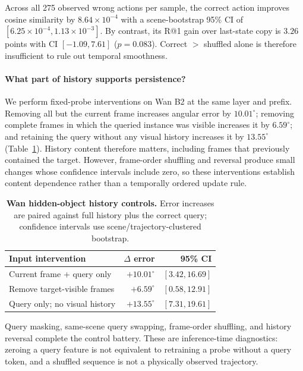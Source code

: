 Across all 275 observed wrong actions per sample, the correct action improves
cosine similarity by $8.64\!\times\!10^{-4}$ with a scene-bootstrap 95\% CI of
$[6.25\!\times\!10^{-4},1.13\!\times\!10^{-3}]$.  By contrast, its R@1 gain
over last-state copy is $3.26$ points with CI $[-1.09,7.61]$ ($p=0.083$).
Correct $>$ shuffled alone is therefore insufficient to rule out temporal
smoothness.

\paragraph{What part of history supports persistence?}
We perform fixed-probe interventions on Wan B2 at the same layer and prefix.
Removing all but the current frame increases angular error by
$10.01^\circ$; removing complete frames in which the queried instance was
visible increases it by $6.59^\circ$; and retaining the query without any visual
history increases it by $13.55^\circ$ (Table~\ref{tab:b2-history-controls}).
History content therefore matters, including frames that previously contained
the target.  However, frame-order shuffling and reversal produce small changes
whose confidence intervals include zero, so these interventions establish
content dependence rather than a temporally ordered update rule.

\begin{table}[t]
  \centering
  \caption{\textbf{Wan hidden-object history controls.}  Error increases are
  paired against full history plus the correct query; confidence intervals use
  scene/trajectory-clustered bootstrap.}
  \label{tab:b2-history-controls}
  \small
  \begin{tabularx}{\columnwidth}{@{}Xrr@{}}
    \toprule
    Input intervention & $\Delta$ error & 95\% CI \\
    \midrule
    Current frame + query only & $+10.01^\circ$ & $[3.42,16.69]$ \\
    Remove target-visible frames & $+6.59^\circ$ & $[0.58,12.91]$ \\
    Query only; no visual history & $+13.55^\circ$ & $[7.31,19.61]$ \\
    \bottomrule
  \end{tabularx}
\end{table}

Query masking, same-scene query swapping, frame-order shuffling, and history
reversal complete the control battery.  These are inference-time diagnostics:
zeroing a query feature is not equivalent to retraining a probe without a query
token, and a shuffled sequence is not a physically observed trajectory.

